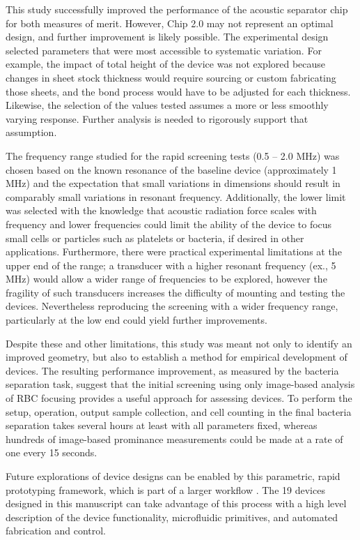 This study successfully improved the performance of the acoustic separator chip for both measures of merit. However, Chip 2.0 may not represent an optimal design, and further improvement is likely possible.  The experimental design selected parameters that were most accessible to systematic variation.  For example, the impact of total height of the device was not explored because changes in sheet stock thickness would require sourcing or custom fabricating those sheets, and the bond process would have to be adjusted for each thickness.  Likewise, the selection of the values tested assumes a more or less smoothly varying response.  Further analysis is needed to rigorously support that assumption.   

The frequency range studied for the rapid screening tests (0.5 -- 2.0 MHz) was chosen based on the known resonance of the baseline device (approximately 1 MHz) and the expectation that small variations in dimensions should result in comparably small variations in resonant frequency.  Additionally, the lower limit was selected with the knowledge that acoustic radiation force scales with frequency and lower frequencies could limit the ability of the device to focus small cells or particles such as platelets or bacteria, if desired in other applications.  Furthermore, there were practical experimental limitations at the upper end of the range; a transducer with a higher resonant frequency (ex., 5 MHz) would allow a wider range of frequencies to be explored, however the fragility of such transducers increases the difficulty of mounting and testing the devices.  Nevertheless reproducing the screening with a wider frequency range, particularly at the low end could yield further improvements.


Despite these and other limitations, this study was meant not only to identify an improved geometry, but also to establish a method for empirical development of devices.  The resulting performance improvement, as measured by the bacteria separation task, suggest that the initial screening using only image-based analysis of RBC focusing provides a useful approach for assessing devices.  To perform the setup, operation, output sample collection, and cell counting in the final bacteria separation takes several hours at least with all parameters fixed, whereas hundreds of image-based prominance measurements could be made at a rate of one every 15 seconds. 

Future explorations of device designs can be enabled by this parametric, rapid prototyping framework, which is part of a larger workflow \cite{ali2017iwbda}\cite{lippai2017iwbda}\cite{krishna2017iwbda}. The 19 devices designed in this manuscript can take advantage of this process with a high level description of the device functionality, microfluidic primitives, and automated fabrication and control.

